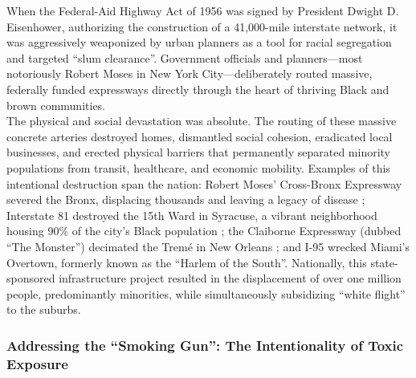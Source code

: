 \documentclass[
]{article}
\begin{document}
When the Federal-Aid Highway Act of 1956 was signed by President Dwight
D. Eisenhower, authorizing the construction of a 41,000-mile interstate
network, it was aggressively weaponized by urban planners as a tool for
racial segregation and targeted ``slum clearance''. Government officials
and planners---most notoriously Robert Moses in New York
City---deliberately routed massive, federally funded expressways
directly through the heart of thriving Black and brown communities.\\
The physical and social devastation was absolute. The routing of these
massive concrete arteries destroyed homes, dismantled social cohesion,
eradicated local businesses, and erected physical barriers that
permanently separated minority populations from transit, healthcare, and
economic mobility. Examples of this intentional destruction span the
nation: Robert Moses' Cross-Bronx Expressway severed the Bronx,
displacing thousands and leaving a legacy of disease ; Interstate 81
destroyed the 15th Ward in Syracuse, a vibrant neighborhood housing 90\%
of the city's Black population ; the Claiborne Expressway (dubbed ``The
Monster'') decimated the Tremé in New Orleans ; and I-95 wrecked Miami's
Overtown, formerly known as the ``Harlem of the South''. Nationally,
this state-sponsored infrastructure project resulted in the displacement
of over one million people, predominantly minorities, while
simultaneously subsidizing ``white flight'' to the suburbs.

\subsubsection{\texorpdfstring{\textbf{Addressing the ``Smoking Gun'':
The Intentionality of Toxic
Exposure}}{Addressing the ``Smoking Gun'': The Intentionality of Toxic Exposure}}\label{addressing-the-smoking-gun-the-intentionality-of-toxic-exposure}
\end{document}
